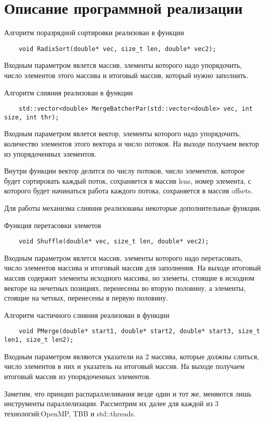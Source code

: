 \documentclass{report}
\begin{document}
\section*{Описание программной реализации}
Алгоритм поразрядной сортировки реализован в функции
\begin{lstlisting}
	void RadixSort(double* vec, size_t len, double* vec2);
\end{lstlisting}
\par Входным параметром явлется массив, элементы которого надо упорядочить, число элементов этого массива и итоговый массив, который нужно заполнить.
\par Алгоритм слияния реализован в функции
\begin{lstlisting}
	std::vector<double> MergeBatcherPar(std::vector<double> vec, int size, int thr);
\end{lstlisting}
\par Входным параметром явлется вектор, элементы которого надо упорядочить, количество элементов этого вектора и число потоков. На выходе получаем вектор из упорядоченных элементов.
\par Внутри функции вектор делится по числу потоков, число элементов, которое будет сортировать каждый поток, сохраняется в массив lens, номер элемента, с которого будет начинаться работа каждого потока, сохраняется в массив offsets. 
\par Для работы механизма слияния реализованы некоторые дополнительные функции.
\par Функция перетасовки элеметов
\begin{lstlisting}
	void Shuffle(double* vec, size_t len, double* vec2);
\end{lstlisting}
\par Входным параметром явлется массив, элементы которого надо перетасовать, число элементов массива и итоговый массив для заполнения. На выходе итоговый массив содержит элементы исходного массива, но элеметы, стоящие в исходном векторе на нечетных позициях, перенесены во вторую половину, а элементы, стоящие на четных, перенесены в первую половину.
\par Алгоритм частичного слияния реализован в функции
\begin{lstlisting}
	void PMerge(double* start1, double* start2, double* start3, size_t len1, size_t len2);
\end{lstlisting}
\par Входным параметром являются указатели на 2 массива, которые должны слиться, число элементов в них и указатель на итоговый массив. На выходе получаем итоговый массив из упорядоченных элементов.
\par Заметим, что принцип распараллеливания везде один и тот же, меняются лишь инструменты параллелизации. Рассмотрим их далее для каждой из 3 технологий:OpenMP, TBB и std::threads.
\newpage
\end{document}
